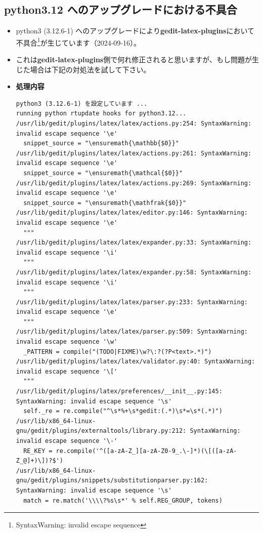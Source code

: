 \documentclass[a4paper,10pt,titlepage,pdfusetitle]{ltjsarticle}
\def\fs#1#2{\fontsize{#1}{#2}\selectfont }
\begin{document}
{\subsection{python3.12 へのアップグレードにおける不具合 }\vspace{-2mm}
\begin{itemize}
  \item python3 (3.12.6-1) へのアップグレードにより\textbf{gedit-latex-plugins}において不具合\footnote{SyntaxWarning: invalid escape sequence}が生じています（2024-09-16）。 
  \item  これは\textbf{gedit-latex-plugins}側で何れ修正されると思いますが、もし問題が生じた場合は下記の対処法を試して下さい。\\
  \item[]\textbf{処理内容}
{\fs{5.6pt}{8}
\begin{verbatim}
python3 (3.12.6-1) を設定しています ...
running python rtupdate hooks for python3.12...
/usr/lib/gedit/plugins/latex/latex/actions.py:254: SyntaxWarning: invalid escape sequence '\e'
  snippet_source = "\ensuremath{\mathbb{$0}}"
/usr/lib/gedit/plugins/latex/latex/actions.py:261: SyntaxWarning: invalid escape sequence '\e'
  snippet_source = "\ensuremath{\mathcal{$0}}"
/usr/lib/gedit/plugins/latex/latex/actions.py:269: SyntaxWarning: invalid escape sequence '\e'
  snippet_source = "\ensuremath{\mathfrak{$0}}"
/usr/lib/gedit/plugins/latex/latex/editor.py:146: SyntaxWarning: invalid escape sequence '\e'
  """
/usr/lib/gedit/plugins/latex/latex/expander.py:33: SyntaxWarning: invalid escape sequence '\i'
  """
/usr/lib/gedit/plugins/latex/latex/expander.py:58: SyntaxWarning: invalid escape sequence '\i'
  """
/usr/lib/gedit/plugins/latex/latex/parser.py:233: SyntaxWarning: invalid escape sequence '\e'
  """
/usr/lib/gedit/plugins/latex/latex/parser.py:509: SyntaxWarning: invalid escape sequence '\w'
  _PATTERN = compile("(TODO|FIXME)\w?\:?(?P<text>.*)")
/usr/lib/gedit/plugins/latex/latex/validator.py:40: SyntaxWarning: invalid escape sequence '\['
  """
/usr/lib/gedit/plugins/latex/preferences/__init__.py:145: SyntaxWarning: invalid escape sequence '\s'
  self._re = re.compile("^\s*%+\s*gedit:(.*)\s*=\s*(.*)")
/usr/lib/x86_64-linux-gnu/gedit/plugins/externaltools/library.py:212: SyntaxWarning: invalid escape sequence '\-'
  RE_KEY = re.compile('^([a-zA-Z_][a-zA-Z0-9_.\-]*)(\[([a-zA-Z_@]+)\])?$')
/usr/lib/x86_64-linux-gnu/gedit/plugins/snippets/substitutionparser.py:162: SyntaxWarning: invalid escape sequence '\s'
  match = re.match('\\\\?%s\s*' % self.REG_GROUP, tokens)

\end{verbatim}}
\end{itemize}}
\end{document}
